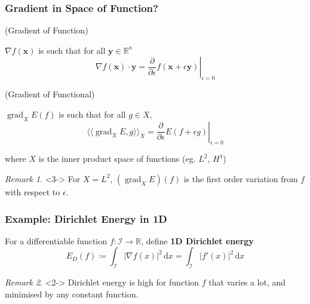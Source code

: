 \documentclass{beamer}
\theoremstyle{remark}
\newtheorem{remark}{Remark}
\newcommand{\xbf}{\mathbf{x}}
\newcommand{\ybf}{\mathbf{y}}
\newcommand{\intd}{\, \text{d}}
\newcommand{\inner}[1]{\langle \langle #1 \rangle \rangle}
\DeclareMathOperator{\grad}{grad}
\begin{document}
\begin{frame}
    \frametitle{Gradient in Space of Function?}

    \begin{multicols}{2}
        {
            (Gradient of Function)

            $\nabla f\left( \xbf \right)$ is such that
            for all $\ybf \in \mathbb{R}^n$
            \begin{equation*}
                \left.\nabla f \left( \xbf \right) \cdot \ybf = \frac{\partial}{\partial \epsilon} f \left( \xbf + \epsilon \ybf \right)\right|_{\epsilon = 0}
                \end{equation*}
            }
        \columnbreak

        {
            (Gradient of Functional)

            $\grad_X E \left( f \right)$ is such that
            for all $g \in X$,
            \begin{equation*}
                \left.\inner{\grad_X E, g}_X = \frac{\partial}{\partial \epsilon} E \left( f + \epsilon g \right)\right|_{\epsilon = 0}
                \end{equation*}
            }
    \end{multicols}
    {
        where $X$ is the inner product space of functions (eg. $L^2$, $H^1$)
    }
    \begin{remark}<3->
        For $X=L^2$, $\left( \grad_X E\right) (f)$ is the first order variation from $f$ with respect to $\epsilon$.
    \end{remark}
\end{frame}

\begin{frame}
    \frametitle{Example: Dirichlet Energy in 1D}
    \begin{definition}
        For a differentiable function $f:\mathcal{I} \rightarrow \mathbb{R}$, define \textbf{1D Dirichlet energy}
        \begin{equation*}
            E_D \left( f \right) \coloneqq \int_{\mathcal{I}} \left| \nabla f(x) \right|^2 \intd x = \int_{\mathcal{I}} \left| f'(x) \right|^2 \intd x
        \end{equation*}
    \end{definition}
    \begin{remark}<2->
        Dirichlet energy is high for function $f$ that varies a lot, and minimised by any constant function.
    \end{remark}
\end{frame}
\end{document}
